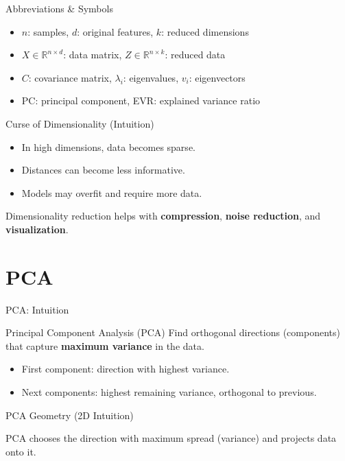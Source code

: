 \documentclass[aspectratio=169]{beamer}
\begin{document}
\begin{frame}{Abbreviations \& Symbols}
  \begin{itemize}[<+->]
    \item $n$: samples,\; $d$: original features,\; $k$: reduced dimensions
    \item $X \in \mathbb{R}^{n\times d}$: data matrix,\; $Z \in \mathbb{R}^{n\times k}$: reduced data
    \item $C$: covariance matrix,\; $\lambda_i$: eigenvalues,\; $v_i$: eigenvectors
    \item PC: principal component,\; EVR: explained variance ratio
  \end{itemize}
\end{frame}

\begin{frame}{Curse of Dimensionality (Intuition)}
  \begin{itemize}[<+->]
    \item In high dimensions, data becomes sparse.
    \item Distances can become less informative.
    \item Models may overfit and require more data.
  \end{itemize}
  \vspace{0.4em}
  Dimensionality reduction helps with \textbf{compression}, \textbf{noise reduction}, and \textbf{visualization}.
\end{frame}

\section{PCA}
\label{sec:pca}

\begin{frame}{PCA: Intuition}
  \begin{block}{Principal Component Analysis (PCA)}
    Find orthogonal directions (components) that capture \textbf{maximum variance} in the data.
  \end{block}
  \vspace{0.4em}
  \begin{itemize}[<+->]
    \item First component: direction with highest variance.
    \item Next components: highest remaining variance, orthogonal to previous.
  \end{itemize}
\end{frame}

\begin{frame}{PCA Geometry (2D Intuition)}
  \centering
  \vspace{0.3em}
  \small PCA chooses the direction with maximum spread (variance) and projects data onto it.
\end{frame}
\end{document}
